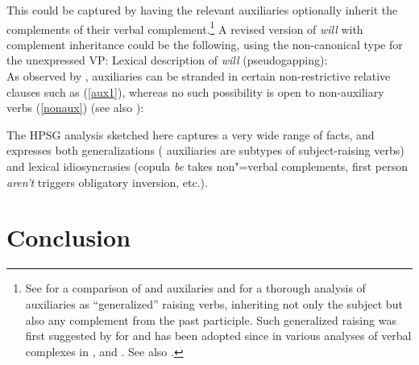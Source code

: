 \noindent
This could be captured by having the relevant auxiliaries optionally inherit the complements of their verbal complement.\footnote{See  for a comparison of  and  auxilaries and  for a thorough analysis of  auxiliaries as ``generalized'' raising verbs, inheriting not only the subject but also any complement from the past participle. Such generalized raising was first suggested by \citet{HN89a,HN94a} for  and has been adopted since in various analyses of verbal complexes in  \citep{Kiss95a,Meurers2000b,Kathol2001a,Mueller99a,Mueller2002b},  \citep{BvN98a} and  \citep[Section~4]{MuellerPersian}. See also .}
A revised version of \emph{will} with complement inheritance could be the following, using the non-canonical  type  for the unexpressed VP:
\ea
Lexical description of \emph{will} (pseudogapping):\\
\z
As observed by \citet{ArnoldandBorsley2008}, auxiliaries can be stranded in certain non-restrictive
relative clauses such as (\ref{aux1}), whereas no such possibility is open to non-auxiliary verbs
(\ref{nonaux}) (see also \crossrefchapteralt[\page \pageref{page-relative-clauses:stranded-aux}]{relative-clauses}):

\eal
{}
\zl

The HPSG analysis sketched here captures a very wide range of facts, and expresses both generalizations ( auxiliaries are subtypes of subject-raising verbs) and lexical idiosyncrasies (copula \emph{be} takes non"=verbal complements, first person \emph{aren't} triggers obligatory inversion, etc.).


	
\section{Conclusion}

